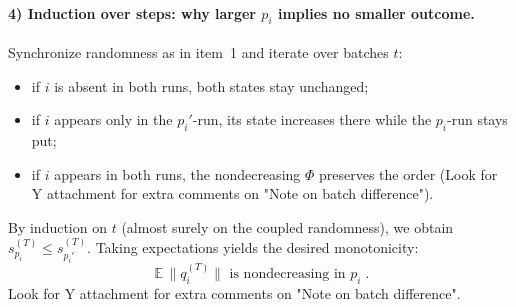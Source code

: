 \paragraph{4) Induction over steps: why larger $p_i$ implies no smaller outcome.}
Synchronize randomness as in item~1 and iterate over batches $t$:
\begin{itemize}
  \item if $i$ is absent in both runs, both states stay unchanged;
  \item if $i$ appears only in the $p_i'$-run, its state increases there while the $p_i$-run stays put;
  \item if $i$ appears in both runs, the nondecreasing $\Phi$ preserves the order (Look for Y attachment for extra comments on "Note on batch difference").
\end{itemize}
By induction on $t$ (almost surely on the coupled randomness), we obtain $s^{(T)}_{p_i} \le s^{(T)}_{p_i'}$. Taking expectations yields the desired monotonicity:
\begin{equation}
\boxed{\; \mathbb E\,\bigl\|q_i^{(T)}\bigr\| \text{ is nondecreasing in } p_i \; }.
\end{equation}
Look for Y attachment for extra comments on "Note on batch difference".
